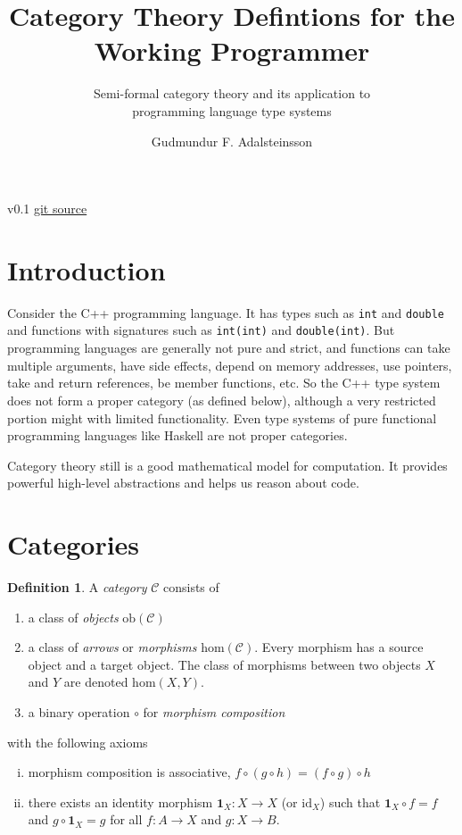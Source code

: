 \documentclass[11pt,a4paper]{scrartcl}
\title{Category Theory Defintions for the \\Working Programmer }
\subtitle{Semi-formal category theory and its application to \\programming language type systems}
\author{Gudmundur F. Adalsteinsson}
\newcommand{\idm}[1]{\mathbf{1}_{#1}}
\newcommand{\cdef}[1]{\emph{#1}}
\theoremstyle{plain}
\theoremstyle{definition}
\newtheorem{defn}{Definition}
\theoremstyle{remark}
\begin{document}
\maketitle
\begin{center}
	v0.1 \href{https://github.com/gummif/categories}{git source}
\end{center}
\tableofcontents
\clearpage

\section{Introduction}

Consider the C++ programming language. It has types such as \texttt{int} and \texttt{double} and functions with signatures such as \texttt{int(int)} and \texttt{double(int)}. But programming languages are generally not pure and strict, and functions can take multiple arguments, have side effects, depend on memory addresses, use pointers, take and return references, be member functions, etc. So the C++ type system does not form a proper category (as defined below), although a very restricted portion might with limited functionality. Even type systems of pure functional programming languages like Haskell are not proper categories. 

Category theory still is a good mathematical model for computation. It provides powerful high-level abstractions and helps us reason about code.

\section{Categories}

\begin{defn}
A \cdef{category} $\mathcal{C}$ consists of
\begin{enumerate}
	\item a class of \cdef{objects} $\text{ob}(\mathcal{C})$
	\item a class of \cdef{arrows} or \cdef{morphisms} $\text{hom}(\mathcal{C})$. Every morphism has a source object and a target object. The class of morphisms between two objects $X$ and $Y$ are denoted $\text{hom}(X,Y)$.
	\item a binary operation $\circ$ for \cdef{morphism composition}
\end{enumerate}
with the following axioms
\begin{enumerate}[(i)]
	\item morphism composition is associative, $f \circ (g \circ h) = (f \circ g) \circ h$
	\item there exists an identity morphism $\idm{X}\colon X \to X$ (or $\text{id}_X$) such that $\idm{X} \circ f = f$ and $g \circ \idm{X} = g$ for all $f\colon A \to X$ and $g\colon X \to B$.
\end{enumerate}
\end{defn}
\end{document}
